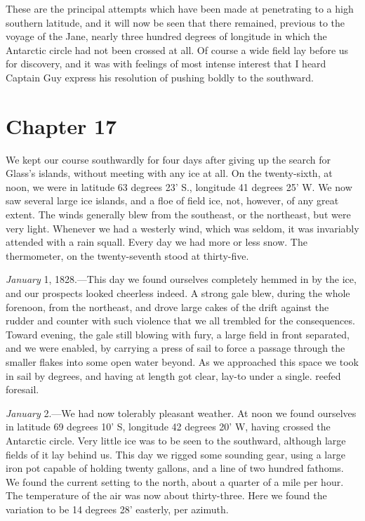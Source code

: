 These are the principal attempts which have been made at penetrating to a
high southern latitude, and it will now be seen that there remained, previous to
the voyage of the Jane, nearly three hundred degrees of longitude in which the
Antarctic circle had not been crossed at all. Of course a wide field lay before
us for discovery, and it was with feelings of most intense interest that I heard
Captain Guy express his resolution of pushing boldly to the southward. 

\section{Chapter 17}
We kept our course southwardly for four days after giving up the search for
Glass's islands, without meeting with any ice at all. On the twenty-sixth, at
noon, we were in latitude 63 degrees 23' S., longitude 41 degrees 25' W. We now
saw several large ice islands, and a floe of field ice, not, however, of any
great extent. The winds generally blew from the southeast, or the northeast, but
were very light. Whenever we had a westerly wind, which was seldom, it was
invariably attended with a rain squall. Every day we had more or less snow. The
thermometer, on the twenty-seventh stood at thirty-five. 

\emph{January} 1, 1828.---This day we found ourselves completely hemmed in by
the ice, and our prospects looked cheerless indeed. A strong gale blew, during
the whole forenoon, from the northeast, and drove large cakes of the drift
against the rudder and counter with such violence that we all trembled for the
consequences. Toward evening, the gale still blowing with fury, a large field in
front separated, and we were enabled, by carrying a press of sail to force a
passage through the smaller flakes into some open water beyond. As we approached
this space we took in sail by degrees, and having at length got clear, lay-to
under a single. reefed foresail. 

\emph{January} 2.---We had now tolerably pleasant weather. At noon we found
ourselves in latitude 69 degrees 10' S, longitude 42 degrees 20' W, having
crossed the Antarctic circle. Very little ice was to be seen to the southward,
although large fields of it lay behind us. This day we rigged some sounding
gear, using a large iron pot capable of holding twenty gallons, and a line of
two hundred fathoms. We found the current setting to the north, about a quarter
of a mile per hour. The temperature of the air was now about thirty-three. Here
we found the variation to be 14 degrees 28' easterly, per azimuth. 

